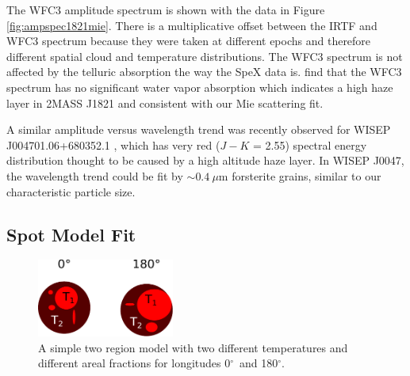 \documentclass[twocolumn]{aastex6}
\newcommand{\degree}{$^\circ$}
\begin{document}
The WFC3 amplitude spectrum is shown with the data in Figure \ref{fig:ampspec1821mie}.
There is a multiplicative offset between the IRTF and WFC3 spectrum because they were taken at different epochs and therefore different spatial cloud and temperature distributions.
The WFC3 spectrum is not affected by the telluric absorption the way the SpeX data is.
\citet{2015ApJ...798L..13Y} find that the WFC3 spectrum has no significant water vapor absorption which indicates a high haze layer in 2MASS J1821 and consistent with our Mie scattering fit.

A similar amplitude versus wavelength trend was recently observed for WISEP J004701.06+680352.1 \citep{2016ApJ...829L..32L}, which has very red ($J-K$ = 2.55) spectral energy distribution thought to be caused by a high altitude haze layer.
In WISEP J0047, the wavelength trend could be fit by $\sim 0.4~\mu$m forsterite grains, similar to our characteristic particle size.

\subsection{Spot Model Fit}\label{sec:spotModel}

\begin{figure}
\begin{centering}
\includegraphics[width=0.4\textwidth]{temperature_drawing.pdf}
\caption{A simple two region model with two different temperatures and different areal fractions for longitudes 0\degree\ and 180\degree.}\label{fig:tdiffschem}
\end{centering}
\end{figure}
\end{document}
